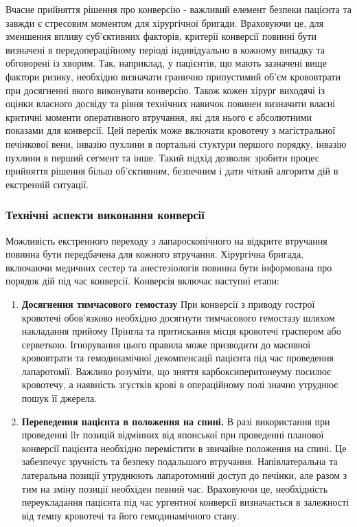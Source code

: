 \begin{refsection}
Вчасне прийняття рішення про конверсію - важливий елемент безпеки пацієнта та завжди є стресовим моментом для хірургічної бригади. Враховуючи це, для зменшення впливу суб'єктивних факторів, критерії конверсії повинні бути визначені в передопераційному періоді індивідуально в кожному випадку та обговорені із хворим. Так, наприклад, у пацієнтів, що мають зазначені вище фактори ризику, необхідно визначати гранично припустимий об'єм крововтрати при досягненні якого виконувати конверсію. Також кожен хірург виходячі із оцінки власного досвіду та рівня технічних навичок повинен визначити власні критичні моменти оперативного втручання, які для нього є абсолютними показами для конверсії. Цей перелік може включати кровотечу з магістральної печінкової вени, інвазію пухлини в портальні стуктури першого порядку, інвазію пухлини в перший сегмент та інше. Такий підхід дозволяє зробити процес прийняття рішення більш об'єктивним, безпечним і дати чіткий алгоритм дій в екстренній ситуації.

\subsubsection{Технічні аспекти виконання конверсії}

Можливість екстренного переходу з лапароскопічного на відкрите втручання повинна бути передбачена для кожного втручання. Хірургічна бригада, включаючи медичних сестер та анестезіологів повинна бути інформована про порядок дій під час конверсії. Конверсія включає наступні етапи:
\begin{enumerate}

    \item \textbf{Досягнення тимчасового гемостазу} При конверсії з приводу гострої кровотечі обов'язково необхідно досягнути тимчасового гемостазу шляхом накладання прийому Прінгла та притискання місця кровотечі граспером або серветкою. Ігнорування цього правила може призводити до масивної крововтрати та гемодинамічної декомпенсації пацієнта під час проведення лапаротомії. Важливо розуміти, що зняття карбоксиперитонеуму посилює кровотечу, а наявність згустків крові в операційному полі значно утруднює пошук її джерела.
    
    \item \textbf{Переведення пацієнта в положення на спині.} В разі використання при проведенні \acrshort{llr} позицій відмінних від японської при проведенні планової конверсії пацієнта необхідно перемістити в звичайне положення на спині. Це забезпечує зручність та безпеку подальшого втручання. Напівлатеральна та латеральна позиції утруднюють лапаротомний доступ до печінки, але разом з тим на зміну позиції необхіден певний час. Враховуючи це, необхідність переукладання пацієнта під час ургентної конверсії визначається в залежності від темпу кровотечі та його гемодинамічного стану. 
    

\end{enumerate}
\end{refsection}
